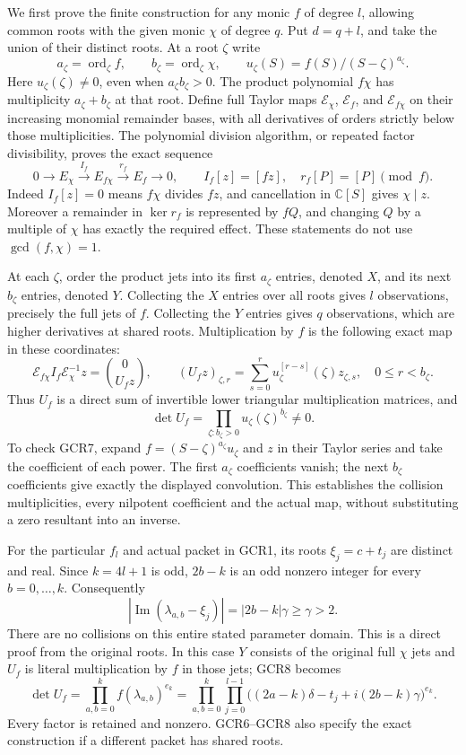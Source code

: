 We first prove the finite construction for any monic $f$ of degree
$l$, allowing common roots with the given monic $\chi$ of degree
$q$. Put $d=q+l$, and take the union of their distinct roots.
At a root $\zeta$ write
\[
 a_\zeta=\operatorname{ord}_\zeta f,\qquad
 b_\zeta=\operatorname{ord}_\zeta\chi,\qquad
 u_\zeta(S)=f(S)/(S-\zeta)^{a_\zeta}.
\]
Here $u_\zeta(\zeta)\ne0$, even when $a_\zeta b_\zeta>0$.
The product polynomial $f\chi$ has multiplicity
$a_\zeta+b_\zeta$ at that root. Define full Taylor maps
$\mathcal E_\chi$, $\mathcal E_f$, and $\mathcal E_{f\chi}$ on
their increasing monomial remainder bases, with all derivatives
of orders strictly below those multiplicities. The polynomial
division algorithm, or repeated factor divisibility, proves the
exact sequence
\[
 0\longrightarrow E_\chi
   \xrightarrow{\ I_f\ }E_{f\chi}
   \xrightarrow{\ r_f\ }E_f\longrightarrow0,\qquad
 I_f[z]=[fz],\quad r_f[P]=[P]\pmod f.
\tag{GCR6}
\]
Indeed $I_f[z]=0$ means $f\chi$ divides $fz$, and cancellation
in $\mathbb C[S]$ gives $\chi\mid z$. Moreover a remainder in
$\ker r_f$ is represented by $fQ$, and changing $Q$ by a multiple
of $\chi$ has exactly the required effect. These statements do
not use $\gcd(f,\chi)=1$.

At each $\zeta$, order the product jets into its first $a_\zeta$
entries, denoted $X$, and its next $b_\zeta$ entries, denoted $Y$.
Collecting the $X$ entries over all roots gives $l$ observations,
precisely the full jets of $f$. Collecting the $Y$ entries gives
$q$ observations, which are higher derivatives at shared roots.
Multiplication by $f$ is the following exact map in these coordinates:
\[
 \mathcal E_{f\chi}I_f\mathcal E_\chi^{-1}z
       =\binom{0}{U_fz},\qquad
 (U_fz)_{\zeta,r}
       =\sum_{s=0}^r u_\zeta^{[r-s]}(\zeta)z_{\zeta,s},
 \quad 0\leq r<b_\zeta.
\tag{GCR7}
\]
Thus $U_f$ is a direct sum of invertible lower triangular
multiplication matrices, and
\[
 \det U_f=\prod_{\zeta:b_\zeta>0}
                          u_\zeta(\zeta)^{b_\zeta}\ne0.
\tag{GCR8}
\]
To check GCR7, expand $f=(S-\zeta)^{a_\zeta}u_\zeta$ and $z$
in their Taylor series and take the coefficient of each power.
The first $a_\zeta$ coefficients vanish; the next $b_\zeta$
coefficients give exactly the displayed convolution. This
establishes the collision multiplicities, every nilpotent
coefficient and the actual map, without substituting a zero
resultant into an inverse.

For the particular $f_l$ and actual packet in GCR1, its roots
$\xi_j=c+t_j$ are distinct and real. Since $k=4l+1$ is odd,
$2b-k$ is an odd nonzero integer for every $b=0,\ldots,k$.
Consequently
\[
 |\operatorname{Im}(\lambda_{a,b}-\xi_j)|
       =|2b-k|\gamma\geq\gamma>2.
\tag{GCR9}
\]
There are no collisions on this entire stated parameter domain.
This is a direct proof from the original roots. In this case
$Y$ consists of the original full $\chi$ jets and
$U_f$ is literal multiplication by $f$ in those jets; GCR8 becomes
\[
 \det U_f=\prod_{a,b=0}^k f(\lambda_{a,b})^{e_k}
 =\prod_{a,b=0}^k\prod_{j=0}^{l-1}
       \big((2a-k)\delta-t_j+i(2b-k)\gamma\big)^{e_k}.
\tag{GCR10}
\]
Every factor is retained and nonzero. GCR6--GCR8 also specify
the exact construction if a different packet has shared roots.


